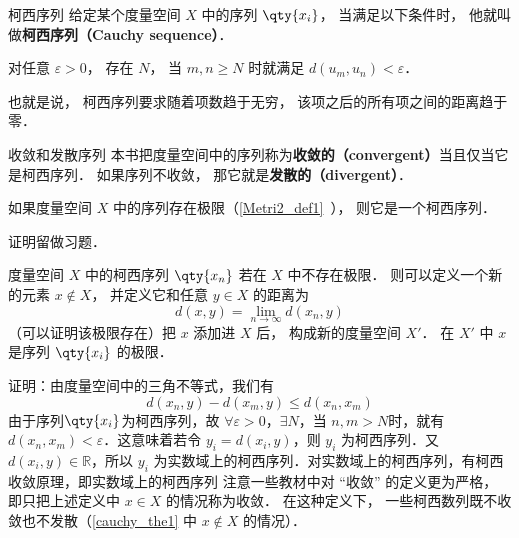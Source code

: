 

\begin{definition}{柯西序列}
给定某个度量空间 $X$ 中的序列 $\qty{x_i}$， 当满足以下条件时， 他就叫做\textbf{柯西序列（Cauchy sequence）}．

对任意 $\varepsilon > 0$， 存在 $N$， 当 $m, n \geqslant N$ 时就满足 $d(u_m, u_n) < \varepsilon$．
\end{definition}
也就是说， 柯西序列要求随着项数趋于无穷， 该项之后的所有项之间的距离趋于零．

\begin{definition}{收敛和发散序列}\label{cauchy_def1}
本书把度量空间中的序列称为\textbf{收敛的（convergent）}当且仅当它是柯西序列． 如果序列不收敛， 那它就是\textbf{发散的（divergent）}．
\end{definition}

\begin{theorem}{}
如果度量空间 $X$ 中的序列存在极限（\autoref{Metri2_def1}~）， 则它是一个柯西序列．
\end{theorem}
证明留做习题．

\begin{theorem}{}\label{cauchy_the1}
度量空间 $X$ 中的柯西序列 $\qty{x_n}$ 若在 $X$ 中不存在极限． 则可以定义一个新的元素 $x \notin X$， 并定义它和任意 $y\in X$ 的距离为
\begin{equation}
d(x, y) = \lim_{n\to\infty} d(x_n, y)
\end{equation}
（可以证明该极限存在）把 $x$ 添加进 $X$ 后， 构成新的度量空间 $X'$． 在 $X'$ 中 $x$ 是序列 $\qty{x_i}$ 的极限．
\end{theorem}
证明：由度量空间中的三角不等式，我们有
\begin{equation}
d(x_n,y)-d(x_m,y)\leq d(x_n,x_m)
\end{equation}
由于序列$\qty{x_i}$为柯西序列，故 $\forall\varepsilon>0$，$\exists N$，当 $n,m>N$时，就有 $d(x_n,x_m)<\varepsilon$．这意味着若令 $y_i=d(x_i,y)$，则 ${y_i}$ 为柯西序列．又 $d(x_i,y)\in \mathbb R$，所以 ${y_i}$ 为实数域上的柯西序列．对实数域上的柯西序列，有柯西收敛原理，即实数域上的柯西序列
注意一些教材中对 “收敛” 的定义更为严格， 即只把上述定义中 $x \in X$ 的情况称为收敛． 在这种定义下， 一些柯西数列既不收敛也不发散（\autoref{cauchy_the1} 中 $x\notin X$ 的情况）．



